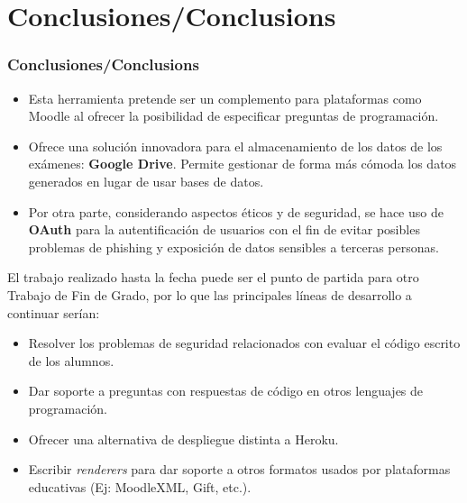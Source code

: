 \documentclass{beamer}
\begin{document}

\section{Conclusiones/Conclusions}
\begin{frame}[allowframebreaks]
  \frametitle{Conclusiones/Conclusions}
  
  \begin{itemize}
    \item Esta herramienta pretende ser un complemento para plataformas como Moodle al ofrecer la posibilidad de
    especificar preguntas de programación.
    \item Ofrece una solución innovadora para el almacenamiento de los datos de los exámenes: {\bfseries Google Drive}.
    Permite gestionar de forma más cómoda los datos generados en lugar de usar bases de datos.
    \item Por otra parte, considerando aspectos éticos y de seguridad, se hace uso de {\bfseries OAuth} para la autentificación de usuarios con el fin de evitar
    posibles problemas de phishing y exposición de datos sensibles a terceras personas.
  \end{itemize}
  \framebreak
  
  El trabajo realizado hasta la fecha puede ser el punto de partida para otro Trabajo de Fin de Grado, por lo que
  las principales líneas de desarrollo a continuar serían:
  \begin{itemize}
    \item Resolver los problemas de seguridad relacionados con evaluar el código escrito de los alumnos.
    \item Dar soporte a preguntas con respuestas de código en otros lenguajes de programación.
    \item Ofrecer una alternativa de despliegue distinta a Heroku.
    \item Escribir \textit{renderers} para dar soporte a otros formatos usados por plataformas educativas (Ej: MoodleXML, Gift, etc.).
  \end{itemize}
  \framebreak
  

\end{frame}
\end{document}
